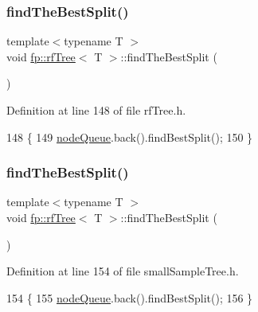 \subsubsection{\texorpdfstring{find\+The\+Best\+Split()}{findTheBestSplit()}\hspace{0.1cm}{\footnotesize\ttfamily [1/2]}}
{\footnotesize\ttfamily template$<$typename T $>$ \\
void \hyperlink{classfp_1_1rfTree}{fp\+::rf\+Tree}$<$ T $>$\+::find\+The\+Best\+Split (\begin{DoxyParamCaption}{ }\end{DoxyParamCaption})\hspace{0.3cm}{\ttfamily [inline]}}



Definition at line 148 of file rf\+Tree.\+h.


\begin{DoxyCode}
148                                               \{
149                     \hyperlink{classfp_1_1rfTree_af72d0a2f930fd480dfb4858885c2df23}{nodeQueue}.back().findBestSplit();
150                 \}
\end{DoxyCode}
\mbox{\label{classfp_1_1rfTree_a51da8e4a46582b26643a4ae392230e77}} 
\subsubsection{\texorpdfstring{find\+The\+Best\+Split()}{findTheBestSplit()}\hspace{0.1cm}{\footnotesize\ttfamily [2/2]}}
{\footnotesize\ttfamily template$<$typename T $>$ \\
void \hyperlink{classfp_1_1rfTree}{fp\+::rf\+Tree}$<$ T $>$\+::find\+The\+Best\+Split (\begin{DoxyParamCaption}{ }\end{DoxyParamCaption})\hspace{0.3cm}{\ttfamily [inline]}}



Definition at line 154 of file small\+Sample\+Tree.\+h.


\begin{DoxyCode}
154                                               \{
155                     \hyperlink{classfp_1_1rfTree_af72d0a2f930fd480dfb4858885c2df23}{nodeQueue}.back().findBestSplit();
156                 \}
\end{DoxyCode}
\mbox{\label{classfp_1_1rfTree_a196d6006e7e2ee0575fa40d7d4621712}} 
